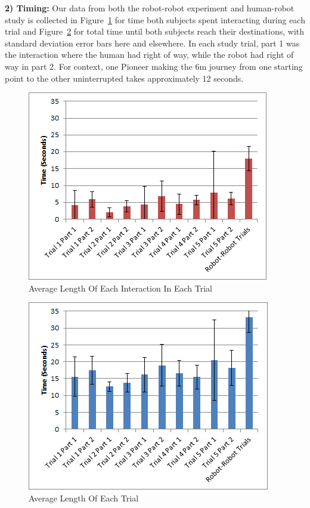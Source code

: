 \documentclass[letterpaper, 10 pt, conference]{ieeeconf}  %
\begin{document}
\textbf{2) Timing:} Our data from both the robot-robot experiment and human-robot study is collected in Figure~\ref{fig:Interaction} for time both subjects spent interacting during each trial and Figure~\ref{fig:Trial} for total time until both subjects reach their destinations, with standard deviation error bars here and elsewhere. In each study trial, part 1 was the interaction where the human had right of way, while the robot had right of way in part 2. For context, one Pioneer making the 6m journey from one starting point to the other uninterrupted takes approximately 12 seconds.   
 

       \begin{figure}
      \centering
      \includegraphics{interaction_length.png}
      \caption{Average Length Of Each Interaction In Each Trial}
      \label{fig:Interaction}
   \end{figure}


     \begin{figure}
      \centering
      \includegraphics{trial_length.png}
      \caption{Average Length Of Each Trial}
      \label{fig:Trial}
   \end{figure}
\end{document}
